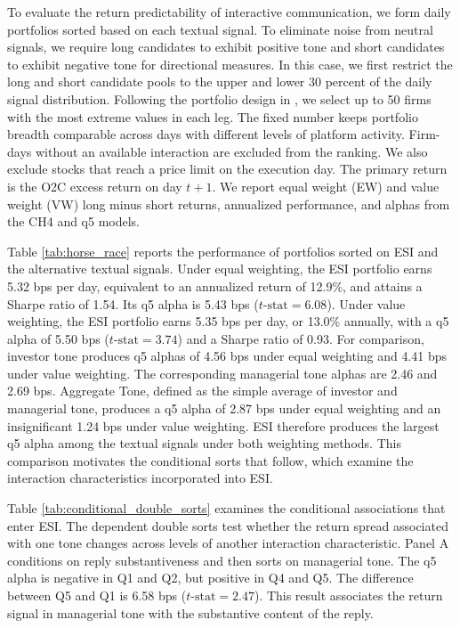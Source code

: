 \documentclass[12pt]{article}
\begin{document}
To evaluate the return predictability of interactive communication, we form daily portfolios sorted based on each textual signal. To eliminate noise from neutral signals, we require long candidates to exhibit positive tone and short candidates to exhibit negative tone for directional measures. In this case, we first restrict the long and short candidate pools to the upper and lower 30 percent of the daily signal distribution. Following the portfolio design in \citet{ke2021predicting}, we select up to 50 firms with the most extreme values in each leg. The fixed number keeps portfolio breadth comparable across days with different levels of platform activity. Firm-days without an available interaction are excluded from the ranking. We also exclude stocks that reach a price limit on the execution day. The primary return is the O2C excess return on day $t+1$. We report equal weight (EW) and value weight (VW) long minus short returns, annualized performance, and alphas from the CH4 and q5 models.


Table \ref{tab:horse_race} reports the performance of portfolios sorted on ESI and the alternative textual signals. Under equal weighting, the ESI portfolio earns 5.32 bps per day, equivalent to an annualized return of 12.9\%, and attains a Sharpe ratio of 1.54. Its q5 alpha is 5.43 bps ($t\text{-stat} = 6.08$). Under value weighting, the ESI portfolio earns 5.35 bps per day, or 13.0\% annually, with a q5 alpha of 5.50 bps ($t\text{-stat} = 3.74$) and a Sharpe ratio of 0.93. For comparison, investor tone produces q5 alphas of 4.56 bps under equal weighting and 4.41 bps under value weighting. The corresponding managerial tone alphas are 2.46 and 2.69 bps. Aggregate Tone, defined as the simple average of investor and managerial tone, produces a q5 alpha of 2.87 bps under equal weighting and an insignificant 1.24 bps under value weighting. ESI therefore produces the largest q5 alpha among the textual signals under both weighting methods. This comparison motivates the conditional sorts that follow, which examine the interaction characteristics incorporated into ESI.

Table \ref{tab:conditional_double_sorts} examines the conditional associations that enter ESI. The dependent double sorts test whether the return spread associated with one tone changes across levels of another interaction characteristic. Panel A conditions on reply substantiveness and then sorts on managerial tone. The q5 alpha is negative in Q1 and Q2, but positive in Q4 and Q5. The difference between Q5 and Q1 is 6.58 bps ($t\text{-stat} = 2.47$). This result associates the return signal in managerial tone with the substantive content of the reply.
\end{document}
